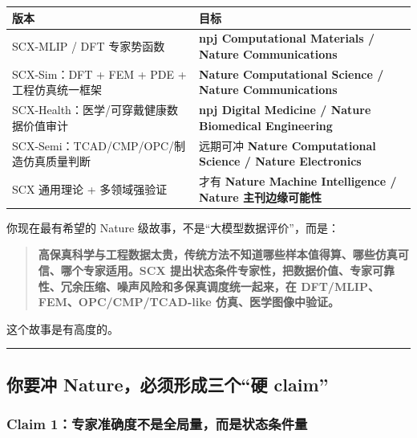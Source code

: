 \documentclass[
  12pt,
]{ctexart}
\begin{document}
\begin{longtable}[]{@{}
  >{\raggedright\arraybackslash}p{}
  >{\raggedright\arraybackslash}p{}@{}}
\toprule\noalign{}
\begin{minipage}[b]{\linewidth}\raggedright
版本
\end{minipage} & \begin{minipage}[b]{\linewidth}\raggedright
目标
\end{minipage} \\
\midrule\noalign{}
\endhead
\bottomrule\noalign{}
\endlastfoot
SCX-MLIP / DFT 专家势函数 & \textbf{npj Computational Materials / Nature
Communications} \\
SCX-Sim：DFT + FEM + PDE + 工程仿真统一框架 & \textbf{Nature
Computational Science / Nature Communications} \\
SCX-Health：医学/可穿戴健康数据价值审计 & \textbf{npj Digital Medicine /
Nature Biomedical Engineering} \\
SCX-Semi：TCAD/CMP/OPC/制造仿真质量判断 & 远期可冲 \textbf{Nature
Computational Science / Nature Electronics} \\
SCX 通用理论 + 多领域强验证 & 才有 \textbf{Nature Machine Intelligence /
Nature 主刊边缘可能性} \\
\end{longtable}

你现在最有希望的 Nature 级故事，不是``大模型数据评价''，而是：

\begin{quote}
\textbf{高保真科学与工程数据太贵，传统方法不知道哪些样本值得算、哪些仿真可信、哪个专家适用。SCX
提出状态条件专家性，把数据价值、专家可靠性、冗余压缩、噪声风险和多保真调度统一起来，在
DFT/MLIP、FEM、OPC/CMP/TCAD-like 仿真、医学图像中验证。}
\end{quote}

这个故事是有高度的。

\begin{center}\rule{0.5\linewidth}{0.5pt}\end{center}

\subsection{你要冲 Nature，必须形成三个``硬
claim''}\label{ux4f60ux8981ux51b2-natureux5fc5ux987bux5f62ux6210ux4e09ux4e2aux786c-claim}

\subsubsection{Claim
1：专家准确度不是全局量，而是状态条件量}\label{claim-1ux4e13ux5bb6ux51c6ux786eux5ea6ux4e0dux662fux5168ux5c40ux91cfux800cux662fux72b6ux6001ux6761ux4ef6ux91cf}
\end{document}
